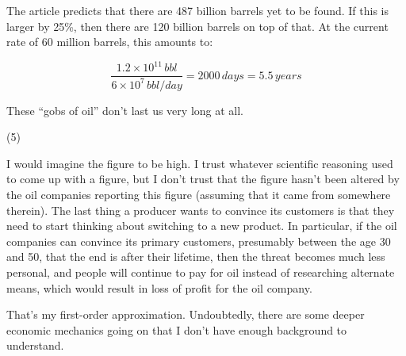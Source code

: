 \documentclass[12pt]{article}
\begin{document}
\begin{description}
The article predicts that there are 487 billion barrels yet to be found.
If this is larger by 25\%, then there are 120 billion barrels on top of
that.  At the current rate of 60 million barrels, this amounts to:

\[
    \frac{1.2 \times 10^11 \, \mathit{bbl}}%
         {6 \times 10^7 \, \mathit{bbl}/\mathit{day}}
  = 2000 \, \mathit{days} = 5.5 \, \mathit{years}
\]

These ``gobs of oil'' don't last us very long at all.

\item (5)

I would imagine the figure to be high.  I trust whatever scientific
reasoning used to come up with a figure, but I don't trust that the
figure hasn't been altered by the oil companies reporting this figure
(assuming that it came from somewhere therein).  The last thing a
producer wants to convince its customers is that they need to start
thinking about switching to a new product.  In particular, if the oil
companies can convince its primary customers, presumably between the age
30 and 50, that the end is after their lifetime, then the threat becomes
much less personal, and people will continue to pay for oil instead of
researching alternate means, which would result in loss of profit for
the oil company.

That's my first-order approximation.  Undoubtedly, there are some deeper
economic mechanics going on that I don't have enough background to
understand.

\end{description}
\end{document}
